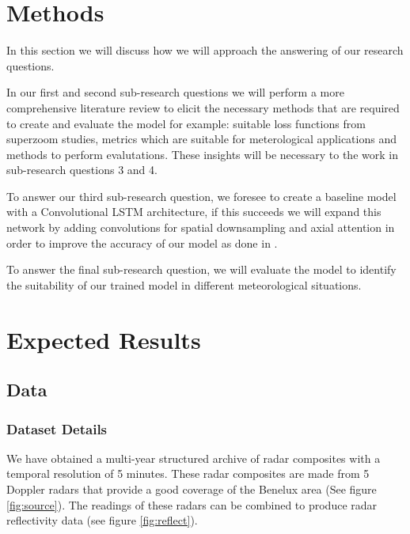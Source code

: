 \documentclass[acmtog, authorversion]{acmart}
\begin{document}
\section{Methods}


In this section we will discuss how we will approach the answering of our research questions.
\medskip

In our first and second sub-research questions we will perform a more comprehensive literature review to elicit the necessary methods that are required to create and evaluate the  model for example: suitable loss functions from superzoom studies, metrics which are suitable for meterological applications and methods to perform evalutations. These insights will be necessary to the work in sub-research questions 3 and 4.
\medskip

To answer our third sub-research question, we foresee to create a baseline model with a Convolutional LSTM architecture, if this succeeds we will expand this network by adding convolutions for spatial downsampling and axial attention in order to improve the accuracy of our model as done in \cite{sønderby2020metnet}.
\medskip

To answer the final sub-research question, we will evaluate the model to identify the suitability of our trained model in different meteorological situations.

\section{Expected Results}

\subsection{Data}

\subsubsection{Dataset Details}

We have obtained a multi-year structured archive of radar composites with a temporal resolution of 5 minutes. These radar composites are made from 5 Doppler radars that provide a good coverage of the Benelux area (See figure \ref{fig:source}). The readings of these radars can be combined to produce radar reflectivity data (see figure \ref{fig:reflect}).
\medskip
\end{document}
